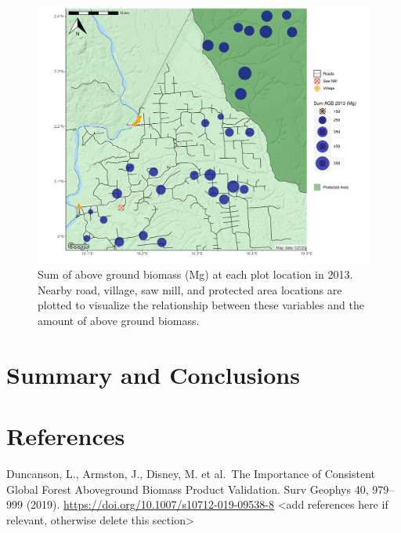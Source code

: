 \documentclass[12pt,]{article}
\begin{document}
\begin{figure}
\centering
\includegraphics{Project_Template_files/figure-latex/mapping2-1.pdf}
\caption{Sum of above ground biomass (Mg) at each plot location in 2013.
Nearby road, village, saw mill, and protected area locations are plotted
to visualize the relationship between these variables and the amount of
above ground biomass.}
\end{figure}

\newpage

\hypertarget{summary-and-conclusions}{%
\section{Summary and Conclusions}\label{summary-and-conclusions}}

\newpage

\hypertarget{references}{%
\section{References}\label{references}}

Duncanson, L., Armston, J., Disney, M. et al.~The Importance of
Consistent Global Forest Aboveground Biomass Product Validation. Surv
Geophys 40, 979--999 (2019).
\url{https://doi.org/10.1007/s10712-019-09538-8} \textless{}add
references here if relevant, otherwise delete this section\textgreater{}
\end{document}
